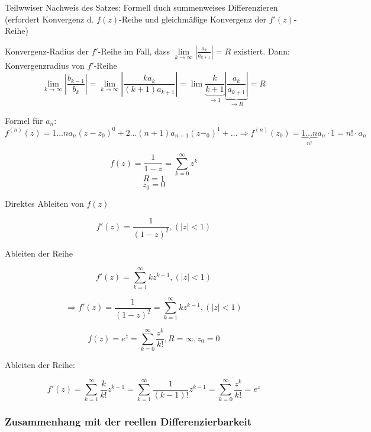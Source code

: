 \documentclass[10pt,a4paper]{article}
\begin{document}

Teilwwiser Nachweis des Satzes: Formell duch summenweises Differenzieren (erfordert Konvergenz d. $f(z)$-Reihe und gleichmäßige Konvergenz der $f'(z)$-Reihe)

Konvergenz-Radius der $f'$-Reihe im Fall, dass $\lim\limits_{k \rightarrow \infty} \left| \frac{a_k}{a_{k+1}}\right| = R$ existiert. Dann: Konvergenzradius von $f'$-Reihe
$$\lim\limits_{k \rightarrow \infty} \left| \frac{b_{k-1}}{b_k}\right|=\lim\limits_{k \rightarrow \infty} \left| \frac{k a_{k}}{(k+1)a_{k+1}}\right| = 
\lim \underbrace{\frac{k}{k+1}}_{\rightarrow 1} \underbrace{\left| \frac{ a_{k}}{a_{k+1}}\right|}_{\rightarrow R} =R$$

Formel für $a_n$: $f^{(n)}(z)=1 \ldots n a_n (z-z_0)^{0} + 2 \ldots (n+1)a_{n+1}(z-_0)^{1}+ \ldots \Rightarrow f^{(n)}(z_0)=\underbrace{1 \ldots n}_{n!} a_n \cdot 1 = n! \cdot a_n$ 


\begin{bsp}[Ableiten von $f(z)=\frac{1}{1-z}$]

$$f(z)=\frac{1}{1-z}=\sum_{k=0}^{\infty} z^{k}$$ $$R=1$$ $$z_0=0$$

Direktes Ableiten von $f(z)$

$$f'(z)=\frac{1}{(1-z)^{2}}, (|z|<1)$$

Ableiten der Reihe

$$f'(z)=\sum_{k=1}^{\infty} k z^{k-1}, (|z|<1)$$

$$\Rightarrow f'(z)=\frac{1}{(1-z)^{2}}=\sum_{k=1}^{\infty} k z^{k-1}, (|z|<1)$$


\end{bsp}


\begin{bsp}[Ableiten von $f(z)=e^{z}$]

$$f(z)=e^{z}=\sum_{k=0}^{\infty} \frac{z^{k}}{k!}, R=\infty, z_0=0$$

Ableiten der Reihe:

$$f'(z)=\sum_{k=1}^{\infty} \frac{k}{k!}z^{k-1}=\sum_{k=1}^{\infty} \frac{1}{(k-1)!} z^{k-1}=\sum_{k=0}^{\infty} \frac{z^{k}}{k!}=e^{z}$$


\end{bsp}

\subsubsection{Zusammenhang mit der reellen Differenzierbarkeit}
\end{document}
